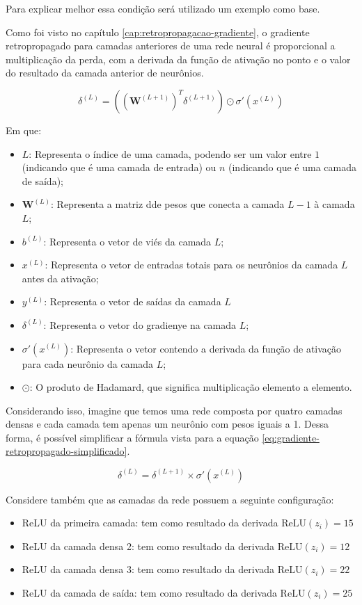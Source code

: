 Para explicar melhor essa condição será utilizado um exemplo como base.

Como foi visto no capítulo \ref{cap:retropropagacao-gradiente}, o gradiente retropropagado para camadas anteriores de uma rede neural é proporcional a multiplicação da perda, com a derivada da função de ativação no ponto e o valor do resultado da camada anterior de neurônios. 

\[
    \delta^{(L)} = \left( \left( \textbf{W}^{(L+1)} \right)^T \delta^{(L+1)} \right)  \odot \sigma'(x^{(L)})
\]

Em que: 

\begin{itemize}
    \item $L$: Representa o índice de uma camada, podendo ser um valor entre $1$ (indicando que é uma camada de entrada) ou $n$ (indicando que é uma camada de saída);
    \item $\textbf{W}^{(L)}$: Representa a matriz dde pesos que conecta a camada $L - 1$ à camada $L$;
    \item $b^{(L)}$: Representa o vetor de viés da camada $L$;
    \item $x^{(L)}$: Representa o vetor de entradas totais para os neurônios da camada $L$ antes da ativação;
    \item $y^{(L)}$: Representa o vetor de saídas da camada $L$
    \item $\delta^{(L)}$: Representa o vetor do gradienye na camada $L$;
    \item $\sigma'(x^{(L)})$: Representa o vetor contendo a derivada da função de ativação para cada neurônio da camada $L$;
    \item $\odot$: O produto de Hadamard, que significa multiplicação elemento a elemento.
\end{itemize}

Considerando isso, imagine que temos uma rede composta por quatro camadas densas e cada camada tem apenas um neurônio com pesos iguais a 1. Dessa forma, é possível simplificar a fórmula vista para a equação \ref{eq:gradiente-retropropagado-simplificado}.

\begin{equation}
        \delta^{(L)} =  \delta^{(L+1)} \times \sigma'(x^{(L)})
        \label{eq:gradiente-retropropagado-simplificado}
\end{equation}

Considere também que as camadas da rede possuem a seguinte configuração:

\begin{itemize}
    \item ReLU da primeira camada: tem como resultado da derivada $\text{ReLU}(z_i) = 15$
    \item ReLU da camada densa 2: tem como resultado da derivada $\text{ReLU}(z_i) = 12$
    \item ReLU da camada densa 3: tem como resultado da derivada $\text{ReLU}(z_i) = 22$
    \item ReLU da camada de saída: tem como resultado da derivada $\text{ReLU}(z_i) = 25$
\end{itemize}

